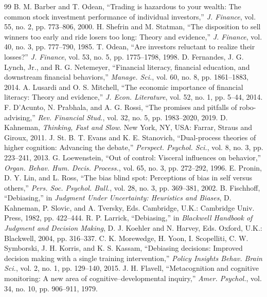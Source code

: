 \documentclass[conference]{IEEEtran}
\begin{document}
\begin{thebibliography}{99}
 B. M. Barber and T. Odean, ``Trading is hazardous to your wealth: The common stock investment performance of individual investors,'' \textit{J. Finance}, vol. 55, no. 2, pp. 773--806, 2000.
 H. Shefrin and M. Statman, ``The disposition to sell winners too early and ride losers too long: Theory and evidence,'' \textit{J. Finance}, vol. 40, no. 3, pp. 777--790, 1985.
 T. Odean, ``Are investors reluctant to realize their losses?'' \textit{J. Finance}, vol. 53, no. 5, pp. 1775--1798, 1998.
 D. Fernandes, J. G. Lynch, Jr., and R. G. Netemeyer, ``Financial literacy, financial education, and downstream financial behaviors,'' \textit{Manage. Sci.}, vol. 60, no. 8, pp. 1861--1883, 2014.
 A. Lusardi and O. S. Mitchell, ``The economic importance of financial literacy: Theory and evidence,'' \textit{J. Econ. Literature}, vol. 52, no. 1, pp. 5--44, 2014.
 F. D'Acunto, N. Prabhala, and A. G. Rossi, ``The promises and pitfalls of robo-advising,'' \textit{Rev. Financial Stud.}, vol. 32, no. 5, pp. 1983--2020, 2019.
 D. Kahneman, \textit{Thinking, Fast and Slow}. New York, NY, USA: Farrar, Straus and Giroux, 2011.
 J. St. B. T. Evans and K. E. Stanovich, ``Dual-process theories of higher cognition: Advancing the debate,'' \textit{Perspect. Psychol. Sci.}, vol. 8, no. 3, pp. 223--241, 2013.
 G. Loewenstein, ``Out of control: Visceral influences on behavior,'' \textit{Organ. Behav. Hum. Decis. Process.}, vol. 65, no. 3, pp. 272--292, 1996.
 E. Pronin, D. Y. Lin, and L. Ross, ``The bias blind spot: Perceptions of bias in self versus others,'' \textit{Pers. Soc. Psychol. Bull.}, vol. 28, no. 3, pp. 369--381, 2002.
 B. Fischhoff, ``Debiasing,'' in \textit{Judgment Under Uncertainty: Heuristics and Biases}, D. Kahneman, P. Slovic, and A. Tversky, Eds. Cambridge, U.K.: Cambridge Univ. Press, 1982, pp. 422--444.
 R. P. Larrick, ``Debiasing,'' in \textit{Blackwell Handbook of Judgment and Decision Making}, D. J. Koehler and N. Harvey, Eds. Oxford, U.K.: Blackwell, 2004, pp. 316--337.
 C. K. Morewedge, H. Yoon, I. Scopelliti, C. W. Symborski, J. H. Korris, and K. S. Kassam, ``Debiasing decisions: Improved decision making with a single training intervention,'' \textit{Policy Insights Behav. Brain Sci.}, vol. 2, no. 1, pp. 129--140, 2015.
 J. H. Flavell, ``Metacognition and cognitive monitoring: A new area of cognitive--developmental inquiry,'' \textit{Amer. Psychol.}, vol. 34, no. 10, pp. 906--911, 1979.

\end{thebibliography}
\end{document}
